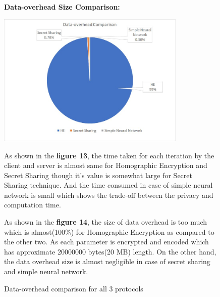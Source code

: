 \documentclass[conference]{IEEEtran}
\begin{document}
\begin{figure}

\textbf{ Data-overhead Size Comparison:}

\vspace{\baselineskip}

\includegraphics[width=90mm,scale=0.7]{Data_overhead_all.jpeg}

\caption{ Data-overhead comparison for all 3 protocols}

As shown in the \textbf{figure 13}, the time taken for each iteration by the client and server is almost same for Homographic Encryption and Secret Sharing though it's value is somewhat large for Secret Sharing technique. And the time consumed in case of simple neural network is small which shows the trade-off between the privacy and computation time.

\vspace{\baselineskip}

As shown in the \textbf{figure 14}, the size of data overhead is too much which is almost(100\%) for Homographic Encryption as compared to the other two. As each parameter is encrypted and encoded which has approximate 20000000 bytes(20 MB) length. On the other hand, the data overhead size is almost negligible in case of secret sharing and simple neural network.


\end{figure}
\end{document}
